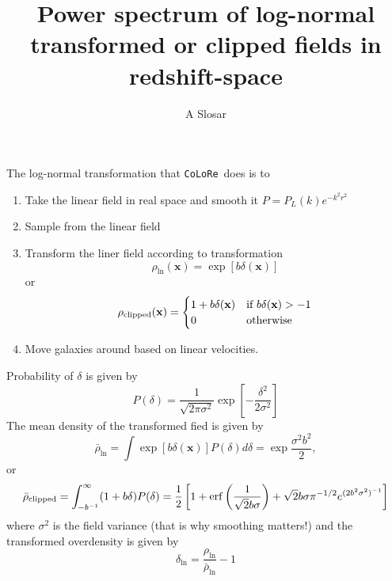 \documentclass[12pt]{article}
\newcommand{\colore}{\texttt{CoLoRe}}
\newcommand{\vx}{\textbf{x}}
\newcommand{\cp}{{\rm clipped}}
\newcommand{\erf}{{\rm erf}}
\begin{document}
\title{Power spectrum of log-normal transformed or clipped fields in
  redshift-space} 

\author{A Slosar}
\maketitle

The log-normal transformation that \colore\ does is to 
\begin{enumerate}
\item Take the linear field in real space and smooth it
  $P=P_L(k)e^{-k^2r^2}$
\item Sample from the linear field
\item Transform the liner field according to transformation
  \begin{equation}
    \rho_{\ln}(\vx) = \exp\left[b\delta(\vx)\right]
  \end{equation}
or
\begin{equation}
    \rho_{\cp}(\vx) = 
  \begin{cases}
    1+b\delta(\vx) & \text{if } b\delta(\vx)>-1 \\
    0 & \text{otherwise}
  \end{cases}
\end{equation}



\item Move galaxies around based on linear velocities.
\end{enumerate}

Probability of $\delta$ is given by 
\begin{equation}
  P(\delta) = \frac{1}{\sqrt{2\pi\sigma^2}} \exp\left[-\frac{\delta^2}{2\sigma^2} \right]
\end{equation}
The mean density of the transformed fied is given by
\begin{equation}
  \bar{\rho}_{\ln} = \int  \exp\left[b\delta(\vx)\right]  P(\delta) d \delta= \exp{\frac{\sigma^2b^2}{2}},
\end{equation}
or
\begin{equation}
  \bar{\rho}_{\cp} = \int_{-b^{-1}}^{\infty} (1+b\delta) P(\delta) =
  \frac{1}{2} \left[1+ \erf\left(\frac{1}{\sqrt{2}b\sigma} \right) +
    \sqrt{2}b\sigma\pi^{-1/2} e^{(2b^2\sigma^2)^{-1}} \right]
\end{equation}
where $\sigma^2$ is the field variance (that is why smoothing
matters!) and the transformed overdensity is given by 
\begin{equation}
  \delta_{\ln} = \frac{\rho_{\ln}}{\bar{\rho}_{\ln}} -1 
\end{equation}
\end{document}
